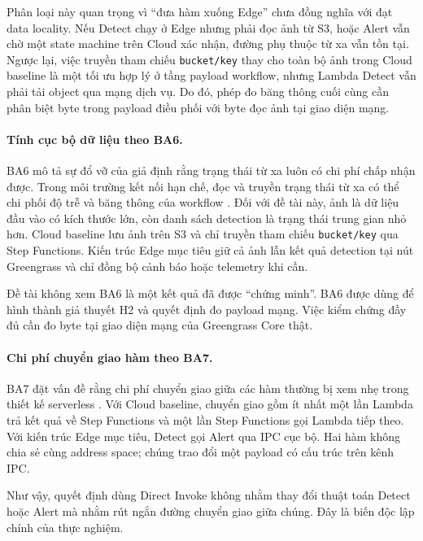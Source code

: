 Phân loại này quan trọng vì ``đưa hàm xuống Edge'' chưa đồng nghĩa với đạt data
locality. Nếu Detect chạy ở Edge nhưng phải đọc ảnh từ S3, hoặc Alert vẫn chờ một
state machine trên Cloud xác nhận, đường phụ thuộc từ xa vẫn tồn tại. Ngược lại,
việc truyền tham chiếu \texttt{bucket/key} thay cho toàn bộ ảnh trong Cloud
baseline là một tối ưu hợp lý ở tầng payload workflow, nhưng Lambda Detect vẫn
phải tải object qua mạng dịch vụ. Do đó, phép đo băng thông cuối cùng cần phân biệt
byte trong payload điều phối với byte đọc ảnh tại giao diện mạng.

\paragraph{Tính cục bộ dữ liệu theo BA6.}

BA6 mô tả sự đổ vỡ của giả định rằng trạng thái từ xa luôn có chi phí chấp nhận
được. Trong môi trường kết nối hạn chế, đọc và truyền trạng thái từ xa có thể chi
phối độ trễ và băng thông của workflow \cite{malazi2026orchestrating}. Đối với đề
tài này, ảnh là dữ liệu đầu vào có kích thước lớn, còn danh sách detection là trạng
thái trung gian nhỏ hơn. Cloud baseline lưu ảnh trên S3 và chỉ truyền tham chiếu
\texttt{bucket/key} qua Step Functions. Kiến trúc Edge mục tiêu giữ cả ảnh lẫn kết
quả detection tại nút Greengrass và chỉ đồng bộ cảnh báo hoặc telemetry khi cần.

Đề tài không xem BA6 là một kết quả đã được ``chứng minh''. BA6 được dùng để hình
thành giả thuyết H2 và quyết định đo payload mạng. Việc kiểm chứng đầy đủ cần đo
byte tại giao diện mạng của Greengrass Core thật.

\paragraph{Chi phí chuyển giao hàm theo BA7.}

BA7 đặt vấn đề rằng chi phí chuyển giao giữa các hàm thường bị xem nhẹ trong thiết
kế serverless \cite{malazi2026orchestrating}. Với Cloud baseline, chuyển giao gồm
ít nhất một lần Lambda trả kết quả về Step Functions và một lần Step Functions gọi
Lambda tiếp theo. Với kiến trúc Edge mục tiêu, Detect gọi Alert qua IPC cục bộ.
Hai hàm không chia sẻ cùng address space; chúng trao đổi một payload có cấu trúc
trên kênh IPC.

Như vậy, quyết định dùng Direct Invoke không nhằm thay đổi thuật toán Detect hoặc
Alert mà nhằm rút ngắn đường chuyển giao giữa chúng. Đây là biến độc lập chính của
thực nghiệm.

